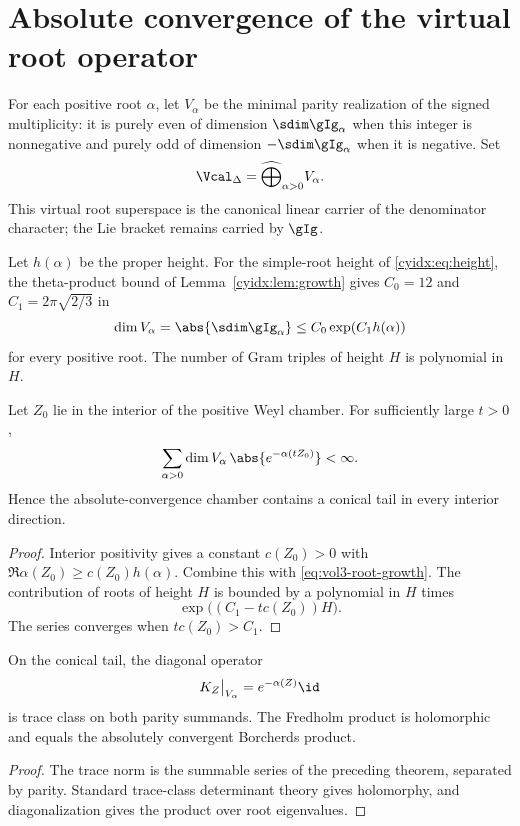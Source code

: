 \chapter{Absolute convergence of the virtual root operator}
For each positive root $\alpha$, let $V_\alpha$ be the minimal parity realization of the signed multiplicity: it is purely even of dimension $\sdim\gIg_\alpha$ when this integer is nonnegative and purely odd of dimension $-\sdim\gIg_\alpha$ when it is negative.  Set
\[
 \Vcal_\Delta=\widehat\bigoplus_{\alpha>0}V_\alpha.
\]
This virtual root superspace is the canonical linear carrier of the denominator character; the Lie bracket remains carried by $\gIg$.

Let $h(\alpha)$ be the proper height. For the simple-root
height of \eqref{cyidx:eq:height}, the theta-product bound
of Lemma~\ref{cyidx:lem:growth} gives $C_0=12$ and
$C_1=2\pi\sqrt{2/3}$ in
\begin{equation}\label{eq:vol3-root-growth}
 \dim V_\alpha=\abs{\sdim\gIg_\alpha}\le C_0\exp(C_1h(\alpha))
\end{equation}
for every positive root.  The number of Gram triples of height $H$ is polynomial in $H$.

\begin{theorem}
Let $Z_0$ lie in the interior of the positive Weyl chamber.  For sufficiently large $t>0$,
\[
 \sum_{\alpha>0}\dim V_\alpha\,
 \abs{e^{-\alpha(tZ_0)}}<\infty.
\]
Hence the absolute-convergence chamber contains a conical tail in every interior direction.
\end{theorem}
\begin{proof}
Interior positivity gives a constant $c(Z_0)>0$ with
$\Re\alpha(Z_0)\ge c(Z_0)h(\alpha)$.
Combine this with \eqref{eq:vol3-root-growth}.  The contribution of roots of height $H$ is bounded by a polynomial in $H$ times
\[
 \exp\bigl((C_1-tc(Z_0))H\bigr).
\]
The series converges when $tc(Z_0)>C_1$.
\end{proof}

\begin{corollary}
On the conical tail, the diagonal operator
\[
 K_Z\big|_{V_\alpha}=e^{-\alpha(Z)}\id
\]
is trace class on both parity summands.  The Fredholm product is holomorphic and equals the absolutely convergent Borcherds product.
\end{corollary}
\begin{proof}
The trace norm is the summable series of the preceding theorem, separated by parity.  Standard trace-class determinant theory gives holomorphy, and diagonalization gives the product over root eigenvalues.
\end{proof}


